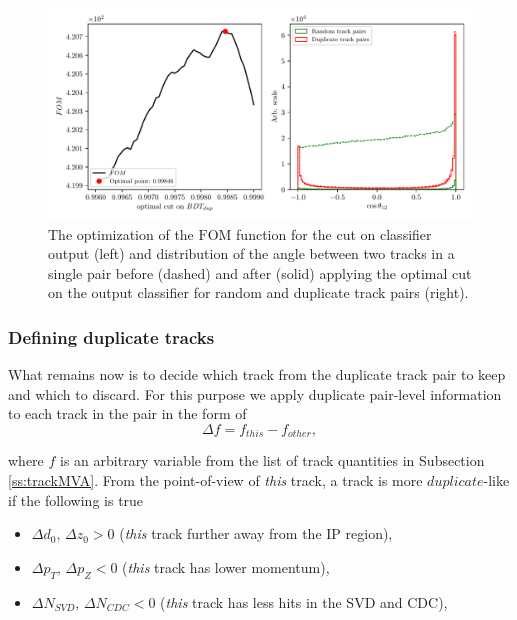 \begin{figure}[H]
\centering
\captionsetup{width=0.8\linewidth}
\includegraphics[width=\linewidth]{fig/ROECleanup_dup_opt}
\caption{The optimization of the $\mathrm{FOM}$ function for the cut on classifier output (left) and distribution of the angle between two tracks in a single pair before (dashed) and after (solid) applying the optimal cut on the output classifier for random and duplicate track pairs (right).}
\label{fig:ROE_dupOpt}
\end{figure}

\subsubsection{Defining duplicate tracks}

What remains now is to decide which track from the duplicate track pair to keep and which to discard. For this purpose we apply duplicate pair-level information to each track in the pair in the form of
\begin{equation}
\Delta f = f_{this} - f_{other},
\end{equation}

where $f$ is an arbitrary variable from the list of track quantities in Subsection \ref{ss:trackMVA}. From the point-of-view of \textit{this} track, a track is more $duplicate$-like if the following is true
\begin{itemize}
\item $\Delta d_0,\,\Delta z_0 > 0$ (\textit{this} track further away from the IP region),
\item $\Delta p_T,\,\Delta p_Z < 0$ (\textit{this} track has lower momentum),
\item $\Delta N_{SVD},\,\Delta N_{CDC} < 0$ (\textit{this} track has less hits in the SVD and CDC),
\end{itemize}

